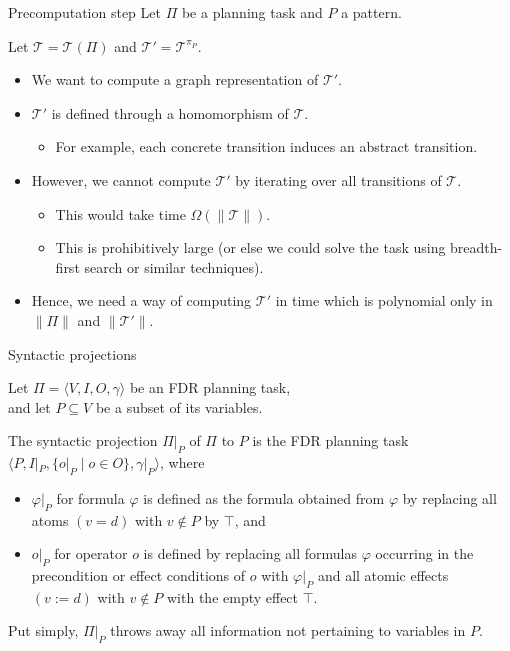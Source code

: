 \documentclass{gkibeamer}
\begin{document}
\begin{frame}{Precomputation step}
  Let $\Pi$ be a planning task and $P$ a pattern.

  Let $\mathcal T = \mathcal T(\Pi)$ and $\mathcal T' = \mathcal
  T^{\pi_P}$.
  \begin{itemize}
  \item We want to compute a graph representation of $\mathcal T'$.
  \item $\mathcal T'$ is defined through a homomorphism of $\mathcal
    T$.
    \begin{itemize}
    \item For example, each concrete transition induces an abstract
      transition.
    \end{itemize}
  \item However, we cannot \alert{compute} $\mathcal T'$ by iterating
    over all transitions of $\mathcal T$.%
    \begin{itemize}
    \item This would take time $\Omega(\|\mathcal T\|)$.
    \item This is prohibitively large (or else we could solve the
      task using breadth-first search or similar techniques).
    \end{itemize}
  \item Hence, we need a way of computing $\mathcal T'$ in time
    which is \alert{polynomial only in $\|\Pi\|$ and $\|\mathcal
      T'\|$}.
  \end{itemize}
\end{frame}

\begin{frame}{Syntactic projections}
  \begin{definition}
    Let $\Pi = \langle V, I, O, \gamma\rangle$ be an FDR planning task, \\
    and let $P \subseteq V$ be a subset of its variables.

    The \alert{syntactic projection $\Pi|_P$} of $\Pi$ to $P$
    is the FDR planning task
    $\langle P, I|_P, \{o|_P \mid o \in O\}, \gamma|_P\rangle$, where
    \begin{itemize}
    \item $\varphi|_P$ for formula $\varphi$ is defined as the
      formula obtained from $\varphi$ by replacing all atoms $(v = d)$
      with $v \notin P$ by $\top$, and
    \item $o|_P$ for operator $o$ is defined by replacing all formulas
      $\varphi$ occurring in the precondition or effect conditions of
      $o$ with $\varphi|_P$ and all atomic effects $(v := d)$ with $v
      \notin P$ with the empty effect $\top$.
    \end{itemize}
  \end{definition}
  Put simply, $\Pi|_P$ throws away all information not pertaining to
  variables in $P$.
\end{frame}
\end{document}

